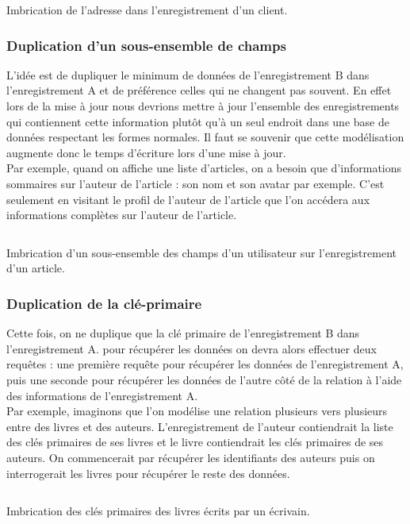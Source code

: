 		\begin{listing}[H]
			\inputminted{json}{code/imbrication.json}
			\caption{Imbrication de l'adresse dans l'enregistrement d'un client.}
		\end{listing}

	\subsubsection{Duplication d'un sous-ensemble de champs}
		L'idée est de dupliquer le minimum de données de l'enregistrement B dans l'enregistrement A et de préférence celles qui ne changent pas souvent. En effet lors de la mise à jour nous devrions mettre à jour l'ensemble des enregistrements qui contiennent cette information plutôt qu'à un seul endroit dans une base de données respectant les formes normales. Il faut se souvenir que cette modélisation augmente donc le temps d'écriture lors d'une mise à jour.\\

		Par exemple, quand on affiche une liste d'articles, on a besoin que d'informations sommaires sur l'auteur de l'article : son nom et son avatar par exemple. C'est seulement en visitant le profil de l'auteur de l'article que l'on accédera aux informations complètes sur l'auteur de l'article.

		\begin{listing}[H]
			\inputminted{json}{code/duplicationSousEnsemble.json}
			\caption{Imbrication d'un sous-ensemble des champs d'un utilisateur sur l'enregistrement d'un article.}
		\end{listing}

	\subsubsection{Duplication de la clé-primaire}
		Cette fois, on ne duplique que la clé primaire de l'enregistrement B dans l'enregistrement A. pour récupérer les données on devra alors effectuer deux requêtes : une première requête pour récupérer les données de l'enregistrement A, puis une seconde pour récupérer les données de l'autre côté de la relation à l'aide des informations de l'enregistrement A.\\

		Par exemple, imaginons que l'on modélise une relation plusieurs vers plusieurs entre des livres et des auteurs. L'enregistrement de l'auteur contiendrait la liste des clés primaires de ses livres et le livre contiendrait les clés primaires de ses auteurs. On commencerait par récupérer les identifiants des auteurs puis on interrogerait les livres pour récupérer le reste des données.

		\begin{listing}[H]
			\inputminted{json}{code/duplicationClesPrimairesLivres.json}
			\caption{Imbrication des clés primaires des livres écrits par un écrivain.}
		\end{listing}
